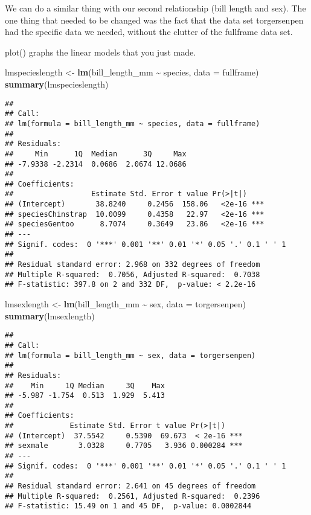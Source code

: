 \documentclass[
]{article}
\newenvironment{Shaded}{\begin{snugshade}}{\end{snugshade}}
\newcommand{\AttributeTok}[1]{\textcolor[rgb]{0.13,0.29,0.53}{#1}}
\newcommand{\FunctionTok}[1]{\textcolor[rgb]{0.13,0.29,0.53}{\textbf{#1}}}
\newcommand{\NormalTok}[1]{#1}
\newcommand{\OtherTok}[1]{\textcolor[rgb]{0.56,0.35,0.01}{#1}}
\newcommand{\SpecialCharTok}[1]{\textcolor[rgb]{0.81,0.36,0.00}{\textbf{#1}}}
\begin{document}
We can do a similar thing with our second relationship (bill length and
sex). The one thing that needed to be changed was the fact that the data
set torgersenpen had the specific data we needed, without the clutter of
the fullframe data set.

plot() graphs the linear models that you just made.

\begin{Shaded}
\begin{Highlighting}[]
\NormalTok{lmspecieslength }\OtherTok{\textless{}{-}} \FunctionTok{lm}\NormalTok{(bill\_length\_mm }\SpecialCharTok{\textasciitilde{}}\NormalTok{ species, }\AttributeTok{data =}\NormalTok{ fullframe)}
\FunctionTok{summary}\NormalTok{(lmspecieslength)}
\end{Highlighting}
\end{Shaded}

\begin{verbatim}
## 
## Call:
## lm(formula = bill_length_mm ~ species, data = fullframe)
## 
## Residuals:
##     Min      1Q  Median      3Q     Max 
## -7.9338 -2.2314  0.0686  2.0674 12.0686 
## 
## Coefficients:
##                  Estimate Std. Error t value Pr(>|t|)    
## (Intercept)       38.8240     0.2456  158.06   <2e-16 ***
## speciesChinstrap  10.0099     0.4358   22.97   <2e-16 ***
## speciesGentoo      8.7074     0.3649   23.86   <2e-16 ***
## ---
## Signif. codes:  0 '***' 0.001 '**' 0.01 '*' 0.05 '.' 0.1 ' ' 1
## 
## Residual standard error: 2.968 on 332 degrees of freedom
## Multiple R-squared:  0.7056, Adjusted R-squared:  0.7038 
## F-statistic: 397.8 on 2 and 332 DF,  p-value: < 2.2e-16
\end{verbatim}

\begin{Shaded}
\begin{Highlighting}[]
\NormalTok{lmsexlength }\OtherTok{\textless{}{-}} \FunctionTok{lm}\NormalTok{(bill\_length\_mm }\SpecialCharTok{\textasciitilde{}}\NormalTok{ sex, }\AttributeTok{data =}\NormalTok{ torgersenpen)}
\FunctionTok{summary}\NormalTok{(lmsexlength)}
\end{Highlighting}
\end{Shaded}

\begin{verbatim}
## 
## Call:
## lm(formula = bill_length_mm ~ sex, data = torgersenpen)
## 
## Residuals:
##    Min     1Q Median     3Q    Max 
## -5.987 -1.754  0.513  1.929  5.413 
## 
## Coefficients:
##             Estimate Std. Error t value Pr(>|t|)    
## (Intercept)  37.5542     0.5390  69.673  < 2e-16 ***
## sexmale       3.0328     0.7705   3.936 0.000284 ***
## ---
## Signif. codes:  0 '***' 0.001 '**' 0.01 '*' 0.05 '.' 0.1 ' ' 1
## 
## Residual standard error: 2.641 on 45 degrees of freedom
## Multiple R-squared:  0.2561, Adjusted R-squared:  0.2396 
## F-statistic: 15.49 on 1 and 45 DF,  p-value: 0.0002844
\end{verbatim}
\end{document}
